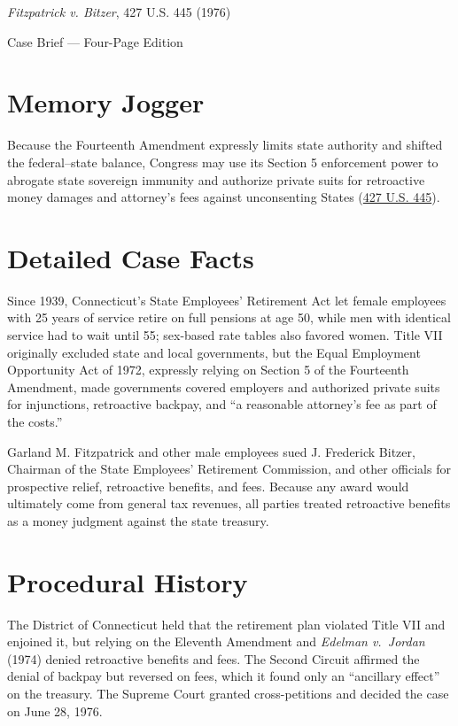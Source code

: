 \documentclass[12pt]{article}
\begin{document}
\begin{center}
{\LARGE \textit{Fitzpatrick v. Bitzer}, 427 U.S. 445 (1976)\par}
\vspace{0.8em}
{\large Case Brief --- Four-Page Edition\par}
\end{center}
\vspace{1em}

\section{Memory Jogger}

Because the Fourteenth Amendment expressly limits state authority and shifted the federal--state balance, Congress may use its Section 5 enforcement power to abrogate state sovereign immunity and authorize private suits for retroactive money damages and attorney's fees against unconsenting States (\href{https://supreme.justia.com/cases/federal/us/427/445/}{427 U.S. 445}).

\section{Detailed Case Facts}

Since 1939, Connecticut's State Employees' Retirement Act let female employees with 25 years of service retire on full pensions at age 50, while men with identical service had to wait until 55; sex-based rate tables also favored women. Title VII originally excluded state and local governments, but the Equal Employment Opportunity Act of 1972, expressly relying on Section 5 of the Fourteenth Amendment, made governments covered employers and authorized private suits for injunctions, retroactive backpay, and ``a reasonable attorney's fee as part of the costs.''

Garland M. Fitzpatrick and other male employees sued J. Frederick Bitzer, Chairman of the State Employees' Retirement Commission, and other officials for prospective relief, retroactive benefits, and fees. Because any award would ultimately come from general tax revenues, all parties treated retroactive benefits as a money judgment against the state treasury.

\section{Procedural History}

The District of Connecticut held that the retirement plan violated Title VII and enjoined it, but relying on the Eleventh Amendment and \textit{Edelman v.\ Jordan} (1974) denied retroactive benefits and fees. The Second Circuit affirmed the denial of backpay but reversed on fees, which it found only an ``ancillary effect'' on the treasury. The Supreme Court granted cross-petitions and decided the case on June 28, 1976.
\end{document}
